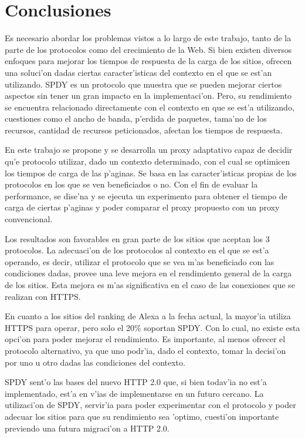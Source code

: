 \chapter{Conclusiones}

Es necesario abordar los problemas vistos a lo largo de este trabajo, tanto de la parte de los protocolos como del crecimiento de la Web. Si bien existen diversos enfoques para mejorar los tiempos de respuesta de la carga de los sitios, ofrecen una soluci'on dadas ciertas caracter'isticas del contexto en el que se est'an utilizando. SPDY es un protocolo que muestra que se pueden mejorar ciertos aspectos sin tener un gran impacto en la implementaci'on. Pero, su rendimiento se encuentra relacionado directamente con el contexto en que se est'a utilizando, cuestiones como el ancho de banda, p'erdida de paquetes, tama'no de los recursos, cantidad de recursos peticionados, afectan los tiempos de respuesta.

En este trabajo se propone y se desarrolla un proxy adaptativo capaz de decidir qu'e protocolo utilizar, dado un contexto determinado, con el cual se optimicen los tiempos de carga de las p'aginas. Se basa en las caracter'isticas propias de los protocolos en los que se ven beneficiados o no. Con el fin de evaluar la performance, se dise'na y se ejecuta un experimento para obtener el tiempo de carga de ciertas p'aginas y poder comparar el proxy propuesto con un proxy convencional.

Los resultados son favorables en gran parte de los sitios que aceptan los 3 protocolos. La adecuaci'on de los protocolos al contexto en el que se est'a operando, es decir, utilizar el protocolo que se vea m'as beneficiado con las condiciones dadas, provee una leve mejora en el rendimiento general de la carga de los sitios. Esta mejora es m'as significativa en el caso de las conexiones que se realizan con HTTPS.

En cuanto a los sitios del ranking de Alexa a la fecha actual, la mayor'ia utiliza HTTPS para operar, pero solo el 20\% soportan SPDY. Con lo cual, no existe esta opci'on para poder mejorar el rendimiento. Es importante, al menos ofrecer el protocolo alternativo, ya que uno podr'ia, dado el contexto, tomar la decisi'on por uno u otro dadas las condiciones del contexto.

SPDY sent'o las bases del nuevo HTTP 2.0 que, si bien todav'ia no est'a implementado, est'a en v'ias de implementarse en un futuro cercano. La utilizaci'on de SPDY, servir'ia para poder experimentar con el protocolo y poder adecuar los sitios para que su rendimiento sea 'optimo, cuesti'on importante previendo una futura migraci'on a HTTP 2.0.

